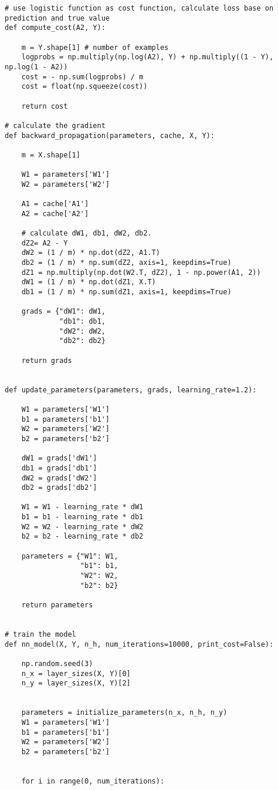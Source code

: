 \documentclass{article}
\begin{document}
\begin{lstlisting}
# use logistic function as cost function, calculate loss base on prediction and true value
def compute_cost(A2, Y):

    m = Y.shape[1] # number of examples
    logprobs = np.multiply(np.log(A2), Y) + np.multiply((1 - Y), np.log(1 - A2))
    cost = - np.sum(logprobs) / m
    cost = float(np.squeeze(cost))

    return cost

# calculate the gradient
def backward_propagation(parameters, cache, X, Y):

    m = X.shape[1]

    W1 = parameters['W1']
    W2 = parameters['W2']

    A1 = cache['A1']
    A2 = cache['A2']

    # calculate dW1, db1, dW2, db2.
    dZ2= A2 - Y
    dW2 = (1 / m) * np.dot(dZ2, A1.T)
    db2 = (1 / m) * np.sum(dZ2, axis=1, keepdims=True)
    dZ1 = np.multiply(np.dot(W2.T, dZ2), 1 - np.power(A1, 2))
    dW1 = (1 / m) * np.dot(dZ1, X.T)
    db1 = (1 / m) * np.sum(dZ1, axis=1, keepdims=True)

    grads = {"dW1": dW1,
             "db1": db1,
             "dW2": dW2,
             "db2": db2}

    return grads


def update_parameters(parameters, grads, learning_rate=1.2):

    W1 = parameters['W1']
    b1 = parameters['b1']
    W2 = parameters['W2']
    b2 = parameters['b2']

    dW1 = grads['dW1']
    db1 = grads['db1']
    dW2 = grads['dW2']
    db2 = grads['db2']

    W1 = W1 - learning_rate * dW1
    b1 = b1 - learning_rate * db1
    W2 = W2 - learning_rate * dW2
    b2 = b2 - learning_rate * db2

    parameters = {"W1": W1,
                  "b1": b1,
                  "W2": W2,
                  "b2": b2}

    return parameters


# train the model
def nn_model(X, Y, n_h, num_iterations=10000, print_cost=False):

    np.random.seed(3)
    n_x = layer_sizes(X, Y)[0]
    n_y = layer_sizes(X, Y)[2]


    parameters = initialize_parameters(n_x, n_h, n_y)
    W1 = parameters['W1']
    b1 = parameters['b1']
    W2 = parameters['W2']
    b2 = parameters['b2']


    for i in range(0, num_iterations):


\end{lstlisting}
\end{document}
